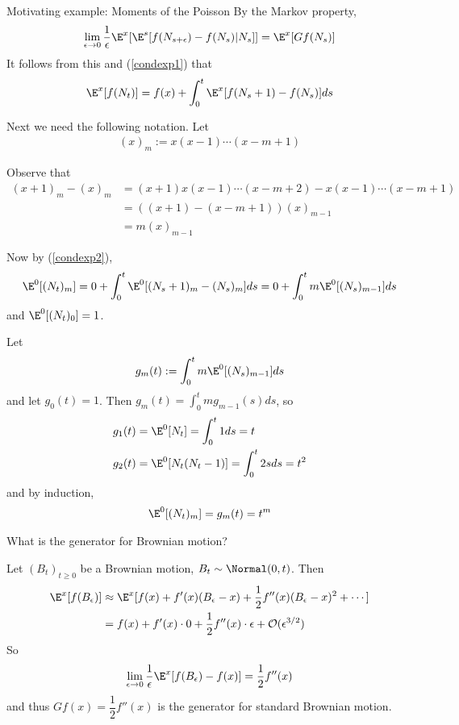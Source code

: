\begin{exmp}{Motivating example: Moments of the Poisson}
 By the Markov property, 
$$\begin{aligned}
 \lim_{\epsilon \to 0}   \frac{1}{\epsilon} \E^x [ \E^s [f(N_{s+\epsilon}) - f(N_s) | N_s] ] =  \E^x[Gf(N_s)]
 \end{aligned}$$
It follows from this and (\ref{condexp1}) that
 \begin{align}
 \label{condexp2}
 \E^x[f(N_t)] = f(x) + \int_0^t \E^x [f(N_s + 1) - f(N_s) ] ds
 \end{align}
 
Next we need the following notation. Let 
$$\begin{aligned}
(x)_m := x(x-1) \cdots (x-m+1)
\end{aligned}$$

Observe that 
$$\begin{aligned}
(x+1)_m - (x)_m &= (x+1) x (x-1) \cdots (x-m+2) - x (x-1) \cdots (x-m+1)\\
& = ( (x+1) - (x-m+1) ) (x)_{m-1} \\
&= m(x)_{m-1}
\end{aligned}$$

Now by (\ref{condexp2}),
$$\begin{aligned}
\E^0 [ (N_t)_m ] =0 + \int_0^{t}  \E^{0} [(N_s+1)_m - (N_s)_{m}] ds = 0 + \int_0^{t} m \E^{0} [(N_s)_{m-1}] ds 
\end{aligned}$$
and $\E^0 [ (N_t)_0 ] = 1$. 

Let 
$$\begin{aligned}
g_{m}(t) := \int_0^{t} m \E^{0} [(N_s)_{m-1}] ds
\end{aligned}$$ 
and let $g_0(t) = 1$. 
Then $g_{m}(t) = \int_0^{t} m g_{m-1}(s) ds$, so
$$\begin{aligned}
g_1(t) &=  \E^0 [N_t]=  \int_{0}^{t}  1ds = t \\
g_2(t) &= \E^0 [N_t(N_t - 1)]  =  \int_{0}^{t}  2sds = t^2 \\
\end{aligned}$$
and by induction,
$$\begin{aligned}
  \E^0 [(N_t)_m] = g_m(t) = t^m
  \end{aligned}$$
\end{exmp}

\begin{exmp}{What is the generator for Brownian motion?}

Let $(B_t)_{t \geq 0}$ be a Brownian motion, $B_t \sim \Normal(0, t)$. 
Then
$$\begin{aligned}
\E^x[f(B_\epsilon)] &\approx \E^x[ f(x) + f'(x) (B_\epsilon - x) + \frac{1}{2}f''(x)(B_\epsilon - x)^2 + \cdots] \\
& =  f(x) + f'(x)\cdot 0 +  \frac{1}{2}f''(x) \cdot \epsilon + \mathcal{O}(\epsilon^{3/2})
\end{aligned}$$
So
$$\begin{aligned}
\lim_{\epsilon \to 0} \dfrac{1}{\epsilon} \E^{x}[ f(B_\epsilon) - f(x) ] = \dfrac{1}{2} f''(x)
\end{aligned}$$
and thus $Gf(x) = \dfrac{1}{2} f''(x)$ is the generator for standard Brownian motion. 

\end{exmp}

